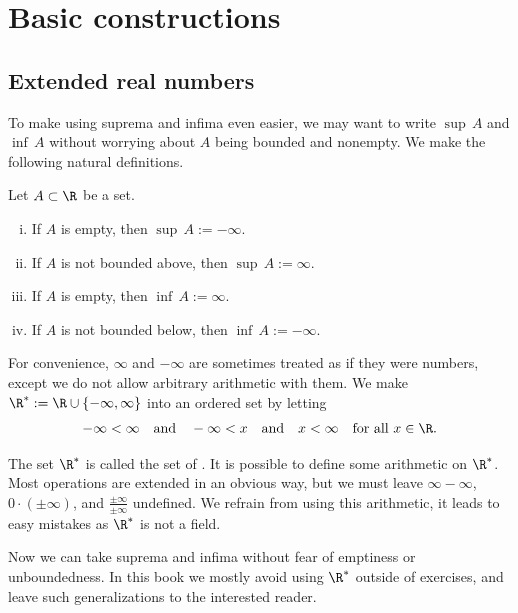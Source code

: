 \documentclass[12pt]{book}
\begin{document}

\sectionnewpage
\section{Basic constructions}

\subsection*{Extended real numbers}

To make using suprema and infima even easier, we may want to
write $\sup\, A$ and $\inf\, A$ without worrying about $A$ being
bounded and nonempty.
We make the following natural definitions.

\begin{defn}
Let $A \subset \R$ be a set.
\begin{enumerate}[(i)]
\item If $A$ is empty, then $\sup\, A := -\infty$.
\item If $A$ is not bounded above, then $\sup\, A := \infty$.
\item If $A$ is empty, then $\inf\, A := \infty$.
\item If $A$ is not bounded below, then $\inf\, A := -\infty$.
\end{enumerate}
\end{defn}

For convenience,  $\infty$ and $-\infty$ are sometimes treated as if they were
numbers, except we do not allow arbitrary arithmetic with them.
We make $\R^* := \R \cup \{ -\infty , \infty\}$ into an ordered set
by letting
\begin{equation*}
-\infty < \infty \quad \text{and} \quad
-\infty < x \quad \text{and} \quad
x < \infty \quad \text{for all $x \in \R$}.
\end{equation*}

The set $\R^*$ is called the set of \emph{}.
It is possible to define some arithmetic on $\R^*$.  
Most operations
are extended in an obvious way, but we must leave
$\infty-\infty$, $0 \cdot (\pm\infty)$, and $\frac{\pm\infty}{\pm\infty}$
undefined.
We refrain from using this arithmetic, it leads to easy mistakes as $\R^*$ is not a field.

Now we can take suprema and infima without fear of emptiness or
unboundedness.  
In this book we mostly avoid using $\R^*$ outside of exercises, and leave such generalizations to the interested reader.
\end{document}
